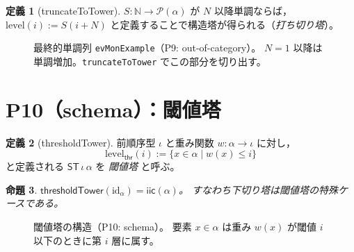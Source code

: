 \documentclass[a4paper,11pt]{ltjsarticle}
\theoremstyle{definition}
\newtheorem{definition}{定義}[section]
\theoremstyle{plain}
\newtheorem{proposition}[definition]{命題}
\theoremstyle{remark}
\newcommand{\ST}{\mathsf{ST}}    %
\newcommand{\lev}{\mathrm{level}}
\begin{document}
\begin{definition}[truncateToTower]\label{def:truncate}
$S : \mathbb{N} \to \mathcal{P}(\alpha)$ が $N$ 以降単調ならば，
$\lev(i) := S(i + N)$ と定義することで構造塔が得られる（\emph{打ち切り塔}）。
\end{definition}

\begin{figure}[H]
\centering
{}
\caption{最終的単調列 \texttt{evMonExample}（P9: out-of-category）。
  $N=1$ 以降は単調増加。\texttt{truncateToTower} でこの部分を切り出す。}
\label{fig:evmon}
\end{figure}

\section{P10（schema）：閾値塔}\label{sec:schema}

\begin{definition}[thresholdTower]\label{def:threshold}
前順序型 $\iota$ と重み関数 $w : \alpha \to \iota$ に対し，
\[
  \lev_{\mathsf{thr}}(i) := \{x \in \alpha \mid w(x) \leq i\}
\]
と定義される $\ST\,\iota\,\alpha$ を \emph{閾値塔} と呼ぶ。
\end{definition}

\begin{proposition}
$\mathsf{thresholdTower}(\mathrm{id}_\alpha) = \mathsf{iic}(\alpha)$。
すなわち下切り塔は閾値塔の特殊ケースである。
\end{proposition}

\begin{figure}[H]
\centering
{}
\caption{閾値塔の構造（P10: schema）。
  要素 $x \in \alpha$ は重み $w(x)$ が閾値 $i$ 以下のときに第 $i$ 層に属す。}
\label{fig:threshold}
\end{figure}
\end{document}
